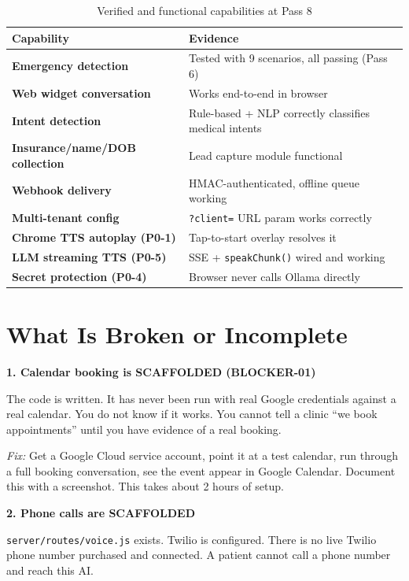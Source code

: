 \documentclass[12pt, a4paper]{report}
\newcommand{\ic}[1]{\texttt{\small\color{accentblue!70!black}#1}}
\begin{document}
\begin{table}[h!]
  \centering
  \renewcommand{\arraystretch}{1.4}
  \begin{tabular}{>{\bfseries}p{5.5cm} p{8.5cm}}
    \toprule
    \rowcolor{tablehead}
    Capability & Evidence \\
    \midrule
    Emergency detection         & Tested with 9 scenarios, all passing (Pass 6) \\
    Web widget conversation     & Works end-to-end in browser \\
    Intent detection            & Rule-based + NLP correctly classifies medical intents \\
    Insurance/name/DOB collection & Lead capture module functional \\
    Webhook delivery            & HMAC-authenticated, offline queue working \\
    Multi-tenant config         & \ic{?client=} URL param works correctly \\
    Chrome TTS autoplay (P0-1)  & Tap-to-start overlay resolves it \\
    LLM streaming TTS (P0-5)   & SSE + \ic{speakChunk()} wired and working \\
    Secret protection (P0-4)    & Browser never calls Ollama directly \\
    \bottomrule
  \end{tabular}
  \caption{Verified and functional capabilities at Pass 8}
\end{table}

\section{What Is Broken or Incomplete}

\textbf{1. Calendar booking is SCAFFOLDED (BLOCKER-01)}

The code is written. It has never been run with real Google credentials against a real
calendar. You do not know if it works. You cannot tell a clinic ``we book appointments''
until you have evidence of a real booking.

\textit{Fix:} Get a Google Cloud service account, point it at a test calendar, run
through a full booking conversation, see the event appear in Google Calendar. Document
this with a screenshot. This takes about 2 hours of setup.

\textbf{2. Phone calls are SCAFFOLDED}

\ic{server/routes/voice.js} exists. Twilio is configured. There is no live Twilio phone
number purchased and connected. A patient cannot call a phone number and reach this AI.
\end{document}
